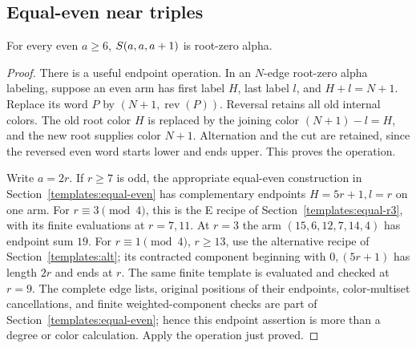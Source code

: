 \subsection{Equal-even near triples}
\label{mc:eeo-near-section}

\begin{proposition}\label{mc:eeo-near}
For every even $a\ge6$, $S\!\left(a,a,a+1\right)$ is root-zero alpha.
\end{proposition}
\begin{proof}
There is a useful endpoint operation.  In an $N$-edge root-zero
alpha labeling, suppose an even arm has first label $H$, last label
$l$, and $H+l=N+1$.  Replace its word $P$ by
$(N+1,\operatorname{rev}(P))$.  Reversal retains all old internal
colors.  The old root color $H$ is replaced by the joining color
$(N+1)-l=H$, and the new root supplies color $N+1$.
Alternation and the cut are retained, since the reversed even word
starts lower and ends upper.  This proves the operation.

Write $a=2r$.  If $r\ge7$ is odd, the appropriate equal-even construction in
Section~\ref{templates:equal-even} has complementary endpoints
$H=5r+1,l=r$ on one arm.  For $r\equiv3\pmod4$, this is the
E recipe of Section~\ref{templates:equal-r3}, with its finite
evaluations at $r=7,11$.  At $r=3$ the arm
$(15,6,12,7,14,4)$ has endpoint sum $19$.  For
$r\equiv1\pmod4$, $r\ge13$, use the alternative recipe of
Section~\ref{templates:alt}; its contracted component beginning with
$0,(5r+1)$ has length $2r$ and ends at $r$.
The same finite template is evaluated and checked at $r=9$.
The complete edge lists, original positions of their endpoints,
color-multiset cancellations, and finite weighted-component checks
are part of Section~\ref{templates:equal-even}; hence this endpoint
assertion is more than a degree or color calculation.  Apply the
operation just proved.


\end{proof}

